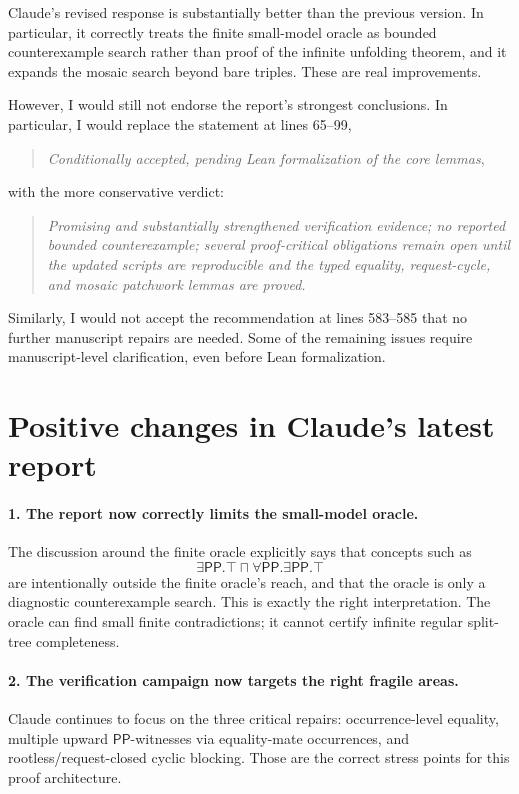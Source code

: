\documentclass[11pt]{article}
\newcommand{\PP}{\mathsf{PP}}
\begin{document}
Claude's revised response is substantially better than the previous version.  In
particular, it correctly treats the finite small-model oracle as bounded
counterexample search rather than proof of the infinite unfolding theorem, and
it expands the mosaic search beyond bare triples.  These are real improvements.

However, I would still not endorse the report's strongest conclusions.  In
particular, I would replace the statement at lines 65--99,
\begin{quote}
\emph{Conditionally accepted, pending Lean formalization of the core lemmas},
\end{quote}
with the more conservative verdict:
\begin{quote}
\emph{Promising and substantially strengthened verification evidence; no
reported bounded counterexample; several proof-critical obligations remain open
until the updated scripts are reproducible and the typed equality, request-cycle,
and mosaic patchwork lemmas are proved.}
\end{quote}

Similarly, I would not accept the recommendation at lines 583--585 that no
further manuscript repairs are needed.  Some of the remaining issues require
manuscript-level clarification, even before Lean formalization.

\section{Positive changes in Claude's latest report}

\paragraph{1. The report now correctly limits the small-model oracle.}
The discussion around the finite oracle explicitly says that concepts such as
\[
  \exists\PP.\top \sqcap \forall\PP.\exists\PP.\top
\]
are intentionally outside the finite oracle's reach, and that the oracle is only
a diagnostic counterexample search.  This is exactly the right interpretation.
The oracle can find small finite contradictions; it cannot certify infinite
regular split-tree completeness.

\paragraph{2. The verification campaign now targets the right fragile areas.}
Claude continues to focus on the three critical repairs: occurrence-level
equality, multiple upward \(\PP\)-witnesses via equality-mate occurrences, and
rootless/request-closed cyclic blocking.  Those are the correct stress points for
this proof architecture.
\end{document}
